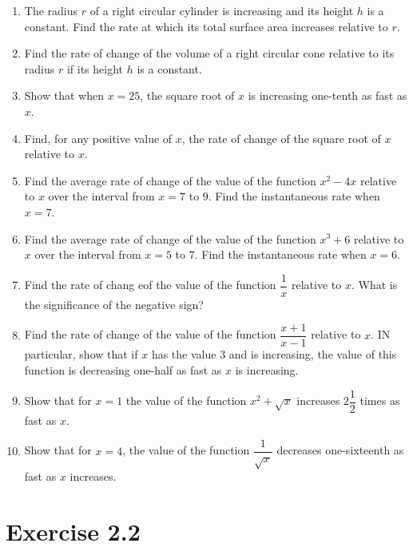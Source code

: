 \documentclass{report}
\begin{document}
\begin{enumerate}
      \item The radius $r$ of a right circular cylinder is increasing and its height $h$ is
            a constant. Find the rate at which its total surface area increases relative to
            $r$.
      \item Find the rate of change of the volume of a right circular cone relative to its
            radius $r$ if its height $h$ is a constant.
      \item Show that when $x = 25$, the square root of $x$ is increasing one-tenth as fast
            as $x$.
      \item Find, for any positive value of $x$, the rate of change of the square root of
            $x$ relative to $x$.
      \item Find the average rate of change of the value of the function $x^2 - 4x$
            relative to $x$ over the interval from $x = 7$ to $9$. Find the instantaneous
            rate when $x= 7$.
      \item Find the average rate of change of the value of the function $x^3 + 6$ relative
            to $x$ over the interval from $x = 5$ to $7$. Find the instantaneous rate when
            $x = 6$.
      \item Find the rate of chang eof the value of the function $\dfrac{1}{x}$ relative to
            $x$. What is the significance of the negative sign?
      \item Find the rate of change of the value of the function $\dfrac{x+1}{x-1}$
            relative to $x$. IN particular, show that if $x$ has the value $3$ and is
            increasing, the value of this function is decreasing one-half as fast as $x$ is
            increasing.
      \item Show that for $x = 1$ the value of the function $x^2 + \sqrt{x}$ increases
            $2\dfrac{1}{2}$ times as fast as $x$.
      \item Show that for $x = 4$, the value of the function $\dfrac{1}{\sqrt{x}}$
            decreases one-sixteenth as fast as $x$ increases.
\end{enumerate}

\newpage
\section{Exercise 2.2}
\end{document}
